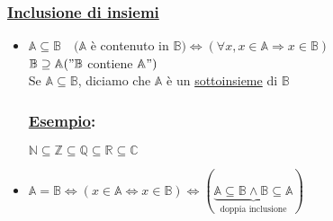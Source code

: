 \documentclass{article}
\newcommand{\ul}[1]{\underline{#1}}
\newcommand{\A}{\mathbb{A}}
\newcommand{\B}{\mathbb{B}}
\newcommand{\R}{\mathbb{R}}
\newcommand{\Esempio}[1]{\subsubsection*{\ul{Esempio}:}#1}
\begin{document}
\subsubsection*{\color{blue}\ul{Inclusione di insiemi}}
\begin{itemize}
	\item $\A\subseteq\B\quad(\A$ è contenuto in $\B)\Leftrightarrow(\forall x,x\in\A\Rightarrow x\in\B)$\\
	      {\color{violet}$\B\supseteq\A("\B$ contiene $\A")$}\\
	      Se $\A\subseteq\B$, diciamo che $\A$ è un \ul{sottoinsieme} di $\B$
	      \Esempio{$\mathbb{N}\subseteq\mathbb{Z}\subseteq\mathbb{Q}\subseteq\R\subseteq\mathbb{C}$}
	\item $\A=\B\Leftrightarrow(x\in\A\Leftrightarrow x\in\B)\Leftrightarrow(\underbrace{\A\subseteq\B\wedge\B\subseteq\A}_{\text{doppia inclusione}})$
\end{itemize}
\end{document}
